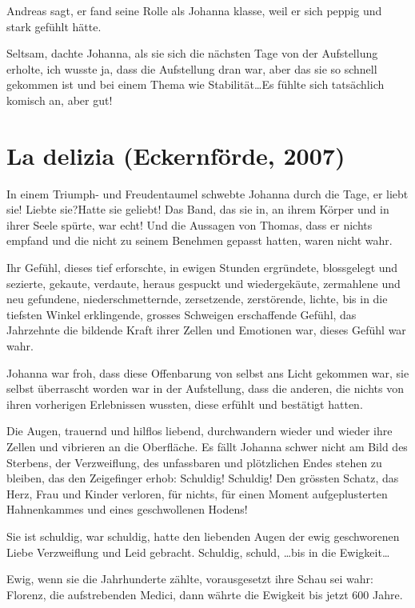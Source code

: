 \documentclass[10pt,titlepage,a5paper]{book}
\begin{document}
Andreas sagt, er fand seine Rolle als Johanna klasse, weil er sich peppig und stark gefühlt hätte.

Seltsam, dachte Johanna, als sie sich die nächsten Tage von der Aufstellung erholte, ich wusste ja, dass die Aufstellung dran war, aber das sie so schnell gekommen ist und bei einem Thema wie Stabilität\dots  Es fühlte sich tatsächlich komisch an, aber gut!



\section*{La delizia (Eckernförde, 2007)}




In einem Triumph- und Freudentaumel schwebte Johanna durch die Tage, er liebt sie! Liebte sie?Hatte sie geliebt! Das Band, das sie in, an ihrem Körper und in ihrer Seele spürte, war echt! Und die Aussagen von Thomas, dass er nichts empfand und die nicht zu seinem Benehmen gepasst hatten, waren nicht wahr.

Ihr Gefühl, dieses tief erforschte, in ewigen Stunden ergründete, blossgelegt und sezierte, gekaute, verdaute, heraus gespuckt und wiedergekäute, zermahlene und neu gefundene, niederschmetternde, zersetzende, zerstörende, lichte, bis in die tiefsten Winkel erklingende, grosses Schweigen erschaffende Gefühl, das Jahrzehnte die bildende Kraft ihrer Zellen und Emotionen war, dieses Gefühl war wahr.

Johanna war froh, dass diese Offenbarung von selbst ans Licht gekommen war, sie selbst überrascht worden war in der Aufstellung, dass die anderen, die nichts von ihren vorherigen Erlebnissen wussten, diese erfühlt und bestätigt hatten.

Die Augen, trauernd und hilflos liebend, durchwandern wieder und wieder ihre Zellen und vibrieren an die Oberfläche.
Es fällt Johanna schwer nicht am Bild des Sterbens, der Verzweiflung, des unfassbaren und plötzlichen Endes stehen zu bleiben, das den Zeigefinger erhob: Schuldig! Schuldig! Den grössten Schatz, das Herz, Frau und Kinder verloren, für nichts, für einen Moment aufgeplusterten Hahnenkammes und eines geschwollenen Hodens!

Sie ist schuldig, war schuldig, hatte den liebenden Augen der ewig geschworenen Liebe  Verzweiflung und Leid gebracht. Schuldig, schuld, \dots bis in die Ewigkeit\dots 

Ewig, wenn sie die Jahrhunderte zählte, vorausgesetzt ihre Schau sei wahr: Florenz, die aufstrebenden Medici, dann währte die Ewigkeit bis jetzt 600 Jahre.
\end{document}
